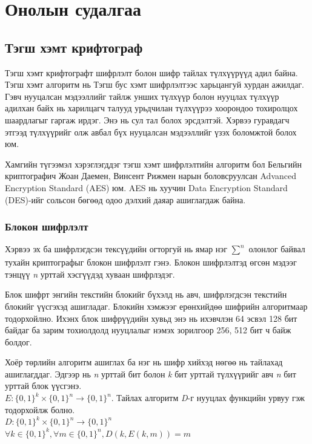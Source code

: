 \chapter{Онолын судалгаа}
\section{Тэгш хэмт крифтограф}
Тэгш хэмт крифтографт шифрлэлт болон шифр тайлах түлхүүрүүд адил байна. Тэгш хэмт алгоритм нь Тэгш бус хэмт шифрлэлтээс харьцангуй хурдан ажилдаг. Гэвч нууцалсан мэдээллийг тайлж унших түлхүүр болон нууцлах түлхүүр адилхан байх нь харилцагч талууд урьдчилан түлхүүрээ хоорондоо тохиролцох шаардлагыг гаргаж ирдэг. Энэ нь сул тал болох эрсдэлтэй. Хэрвээ гуравдагч этгээд түлхүүрийг олж авбал бүх нууцалсан мэдээллийг үзэх боломжтой болох юм.

Хамгийн түгээмэл хэрэглэгддэг тэгш хэмт шифрлэлтийн алгоритм бол Бельгийн криптографич Жоан Даемен, Винсент Рижмен нарын боловсруулсан Advanced Encryption Standard (AES) юм. AES нь хуучин Data Encryption Standard (DES)-ийг сольсон бөгөөд одоо дэлхий даяар ашиглагдаж байна.\cite{AES}
\subsection{Блокон шифрлэлт}

Хэрвээ эх ба шифрлэгдсэн тексүүдийн огторгуй нь ямар нэг $\sum_{}^{n}$ олонлог байвал тухайн криптографыг блокон шифрлэлт гэнэ. Блокон шифрлэлтэд өгсөн мэдээг тэнцүү \textit{n} урттай хэсгүүдэд хуваан шифрлэдэг.\cite{intro_crypo}

Блок шифрт энгийн текстийн блокийг бүхэлд нь авч, шифрлэгдсэн текстийн блокийг үүсгэхэд ашигладаг. Блокийн хэмжээг ерөнхийдөө шифрийн алгоритмаар тодорхойлно. Ихэнх блок шифрүүдийн хувьд энэ нь ихэвчлэн 64 эсвэл 128 бит байдаг ба зарим тохиолдолд нууцлалыг нэмэх зорилгоор 256, 512 бит ч байж болдог.


Хоёр төрлийн алгоритм ашиглах ба нэг нь шифр хийхэд нөгөө нь тайлахад ашиглагддаг. Эдгээр нь \textit{n} урттай бит болон \textit{k} бит урттай түлхүүрийг авч \textit{n} бит урттай блок үүсгэнэ.\\$E: \{0,1\}^k \times \{0,1\}^n \rightarrow \{0,1\}^n$.
	Тайлах алгоритм \textit{D}-г нууцлах функцийн урвуу гэж тодорхойлж болно.\\ $D: \{0,1\}^k \times \{0,1\}^n \rightarrow \{0,1\}^n$\\
$\forall k \in \{0,1\}^k, \forall m \in \{0,1\}^n, D(k, E(k, m)) = m$\\
	\cite{modern_crypto}

